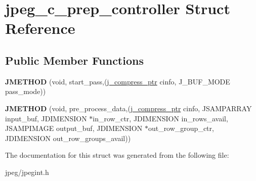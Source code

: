\hypertarget{structjpeg__c__prep__controller}{}\section{jpeg\+\_\+c\+\_\+prep\+\_\+controller Struct Reference}
\label{structjpeg__c__prep__controller}
\subsection*{Public Member Functions}
\begin{DoxyCompactItemize}
\item 
{\bfseries J\+M\+E\+T\+H\+OD} (void, start\+\_\+pass,(\hyperlink{structjpeg__compress__struct}{j\+\_\+compress\+\_\+ptr} cinfo, J\+\_\+\+B\+U\+F\+\_\+\+M\+O\+DE pass\+\_\+mode))\hypertarget{structjpeg__c__prep__controller_af2fb43bbf035ffe6b1a28fb2382db63d}{}\label{structjpeg__c__prep__controller_af2fb43bbf035ffe6b1a28fb2382db63d}

\item 
{\bfseries J\+M\+E\+T\+H\+OD} (void, pre\+\_\+process\+\_\+data,(\hyperlink{structjpeg__compress__struct}{j\+\_\+compress\+\_\+ptr} cinfo,   J\+S\+A\+M\+P\+A\+R\+R\+AY input\+\_\+buf,   J\+D\+I\+M\+E\+N\+S\+I\+ON $\ast$in\+\_\+row\+\_\+ctr,   J\+D\+I\+M\+E\+N\+S\+I\+ON in\+\_\+rows\+\_\+avail,   J\+S\+A\+M\+P\+I\+M\+A\+GE output\+\_\+buf,   J\+D\+I\+M\+E\+N\+S\+I\+ON $\ast$out\+\_\+row\+\_\+group\+\_\+ctr,   J\+D\+I\+M\+E\+N\+S\+I\+ON out\+\_\+row\+\_\+groups\+\_\+avail))\hypertarget{structjpeg__c__prep__controller_a81260cb8fed50d4accf3a7b63ea62c18}{}\label{structjpeg__c__prep__controller_a81260cb8fed50d4accf3a7b63ea62c18}

\end{DoxyCompactItemize}


The documentation for this struct was generated from the following file\+:\begin{DoxyCompactItemize}
\item 
jpeg/jpegint.\+h\end{DoxyCompactItemize}
